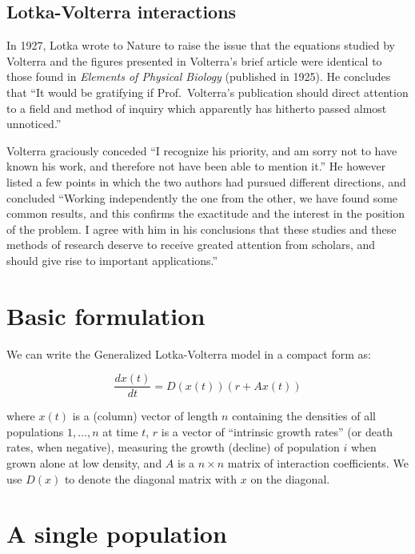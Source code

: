 \documentclass[]{book}
\begin{document}
\hypertarget{lotka-volterra-interactions}{%
\subsection{Lotka-Volterra interactions}\label{lotka-volterra-interactions}}

In 1927, Lotka wrote to Nature to raise the issue that the equations studied by Volterra and the figures presented in Volterra's brief article were identical to those found in \emph{Elements of Physical Biology} (published in 1925). He concludes that ``It would be gratifying if Prof.~Volterra's publication should direct attention to a field and method of inquiry which apparently has hitherto passed almost unnoticed.''

Volterra graciously conceded ``I recognize his priority, and am sorry not to have known his work, and therefore not have been able to mention it.'' He however listed a few points in which the two authors had pursued different directions, and concluded ``Working independently the one from the other, we have found some common results, and this confirms the exactitude and the interest in the position of the problem. I agree with him in his conclusions that these studies and these methods of research deserve to receive greated attention from scholars, and should give rise to important applications.''

\hypertarget{basic-formulation}{%
\section{Basic formulation}\label{basic-formulation}}

We can write the Generalized Lotka-Volterra model in a compact form as:

\[
\dfrac{dx(t)}{dt} = D(x(t))(r + A x(t))
\]

where \(x(t)\) is a (column) vector of length \(n\) containing the densities of all populations \(1, \ldots, n\) at time \(t\), \(r\) is a vector of ``intrinsic growth rates'' (or death rates, when negative), measuring the growth (decline) of population \(i\) when grown alone at low density, and \(A\) is a \(n \times n\) matrix of interaction coefficients. We use \(D(x)\) to denote the diagonal matrix with \(x\) on the diagonal.

\hypertarget{a-single-population}{%
\section{A single population}\label{a-single-population}}
\end{document}
